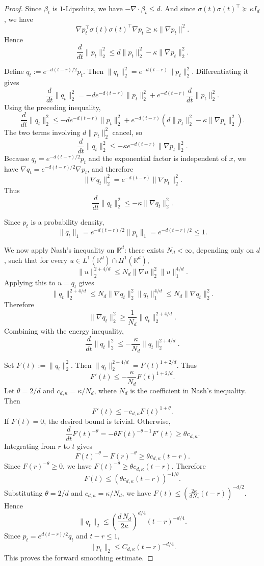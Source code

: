 \documentclass{article}
\newcommand{\1}{\mathbbm{1}}
\numberwithin{equation}{section}
\begin{document}
\begin{proof}
Since $\beta_t$ is $1$-Lipschitz, we have $-\nabla\cdot\beta_t\le d$. And since
$\sigma(t)\sigma(t)^\top\succeq\kappa I_d$, we have
$$
\nabla p_t^\top\sigma(t)\sigma(t)^\top\nabla p_t
\ge
\kappa \|\nabla p_t\|^2 .
$$
Hence
$$
\frac{d}{dt}\|p_t\|_2^2
\le
d\|p_t\|_2^2-\kappa\|\nabla p_t\|_2^2 .
$$

Define $q_t:=e^{-d(t-r)/2}p_t$. Then $\|q_t\|_2^2=e^{-d(t-r)}\|p_t\|_2^2$. Differentiating it gives
$$
\frac{d}{dt}\|q_t\|_2^2
=
-d e^{-d(t-r)}\|p_t\|_2^2
+
e^{-d(t-r)}\frac{d}{dt}\|p_t\|_2^2 .
$$
Using the preceding inequality,
$$
\frac{d}{dt}\|q_t\|_2^2
\le
-d e^{-d(t-r)}\|p_t\|_2^2
+
e^{-d(t-r)}
\left(
d\|p_t\|_2^2-\kappa\|\nabla p_t\|_2^2
\right).
$$
The two terms involving $d\|p_t\|_2^2$ cancel, so
$$
\frac{d}{dt}\|q_t\|_2^2
\le
-\kappa e^{-d(t-r)}\|\nabla p_t\|_2^2 .
$$
Because $q_t=e^{-d(t-r)/2}p_t$ and the exponential factor is independent of
$x$, we have $\nabla q_t=e^{-d(t-r)/2}\nabla p_t$, and therefore
$$
\|\nabla q_t\|_2^2=e^{-d(t-r)}\|\nabla p_t\|_2^2 .
$$
Thus
$$
\frac{d}{dt}\|q_t\|_2^2
\le
-\kappa\|\nabla q_t\|_2^2 .
$$

Since $p_t$ is a probability density,
$$
\|q_t\|_1
=
e^{-d(t-r)/2}\|p_t\|_1
=
e^{-d(t-r)/2}
\le 1 .
$$

We now apply Nash's inequality on $\mathbb R^d$: there exists
$N_d<\infty$, depending only on $d$, such that for every
$u\in L^1(\mathbb R^d)\cap H^1(\mathbb R^d)$,
$$
\|u\|_2^{2+4/d}
\le
N_d\|\nabla u\|_2^2\|u\|_1^{4/d}.
$$
Applying this to $u=q_t$ gives
$$
\|q_t\|_2^{2+4/d}
\le
N_d\|\nabla q_t\|_2^2\|q_t\|_1^{4/d}
\le
N_d\|\nabla q_t\|_2^2 .
$$
Therefore
$$
\|\nabla q_t\|_2^2
\ge
\frac1{N_d}\|q_t\|_2^{2+4/d}.
$$
Combining with the energy inequality,
$$
\frac{d}{dt}\|q_t\|_2^2
\le
-\frac{\kappa}{N_d}\|q_t\|_2^{2+4/d}.
$$

Set $F(t):=\|q_t\|_2^2$. Then $\|q_t\|_2^{2+4/d}=F(t)^{1+2/d}$. Thus
$$
F'(t)\le -\frac{\kappa}{N_d}F(t)^{1+2/d}.
$$
Let $\theta=2/d$ and $c_{d,\kappa}=\kappa/N_d$, where $N_d$ is the coefficient in Nash's inequality. Then
$$
F'(t)\le -c_{d,\kappa}F(t)^{1+\theta}.
$$
If $F(t)=0$, the desired bound is trivial. Otherwise,
$$
\frac{d}{dt}F(t)^{-\theta}
=
-\theta F(t)^{-\theta-1}F'(t)
\ge
\theta c_{d,\kappa} .
$$
Integrating from $r$ to $t$ gives
$$
F(t)^{-\theta}-F(r)^{-\theta}
\ge
\theta c_{d,\kappa} (t-r).
$$
Since $F(r)^{-\theta}\ge 0$, we have $F(t)^{-\theta}\ge \theta c_{d,\kappa}(t-r)$. Therefore
$$
F(t)
\le
(\theta c_{d,\kappa}(t-r))^{-1/\theta}.
$$
Substituting $\theta=2/d$ and $c_{d,\kappa}=\kappa/N_d$, we have $F(t)
\le
\left(\frac{2\kappa}{d\,N_d}(t-r)\right)^{-d/2}.$
Hence
$$
\|q_t\|_2
\le
\left(\frac{d\,N_d}{2\kappa}\right)^{d/4}(t-r)^{-d/4}.
$$
Since $p_t=e^{d(t-r)/2}q_t$ and $t-r\le 1$,
$$
\|p_t\|_2
\le
C_{d,\kappa}(t-r)^{-d/4}.
$$
This proves the forward smoothing estimate.


\end{proof}
\end{document}
